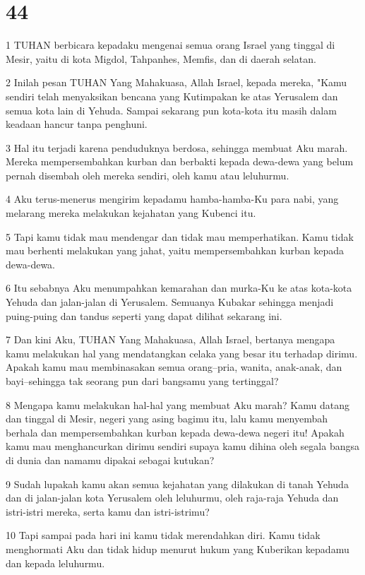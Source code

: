 \chapter{44}

\par 1 TUHAN berbicara kepadaku mengenai semua orang Israel yang tinggal di Mesir, yaitu di kota Migdol, Tahpanhes, Memfis, dan di daerah selatan.
\par 2 Inilah pesan TUHAN Yang Mahakuasa, Allah Israel, kepada mereka, "Kamu sendiri telah menyaksikan bencana yang Kutimpakan ke atas Yerusalem dan semua kota lain di Yehuda. Sampai sekarang pun kota-kota itu masih dalam keadaan hancur tanpa penghuni.
\par 3 Hal itu terjadi karena penduduknya berdosa, sehingga membuat Aku marah. Mereka mempersembahkan kurban dan berbakti kepada dewa-dewa yang belum pernah disembah oleh mereka sendiri, oleh kamu atau leluhurmu.
\par 4 Aku terus-menerus mengirim kepadamu hamba-hamba-Ku para nabi, yang melarang mereka melakukan kejahatan yang Kubenci itu.
\par 5 Tapi kamu tidak mau mendengar dan tidak mau memperhatikan. Kamu tidak mau berhenti melakukan yang jahat, yaitu mempersembahkan kurban kepada dewa-dewa.
\par 6 Itu sebabnya Aku menumpahkan kemarahan dan murka-Ku ke atas kota-kota Yehuda dan jalan-jalan di Yerusalem. Semuanya Kubakar sehingga menjadi puing-puing dan tandus seperti yang dapat dilihat sekarang ini.
\par 7 Dan kini Aku, TUHAN Yang Mahakuasa, Allah Israel, bertanya mengapa kamu melakukan hal yang mendatangkan celaka yang besar itu terhadap dirimu. Apakah kamu mau membinasakan semua orang--pria, wanita, anak-anak, dan bayi--sehingga tak seorang pun dari bangsamu yang tertinggal?
\par 8 Mengapa kamu melakukan hal-hal yang membuat Aku marah? Kamu datang dan tinggal di Mesir, negeri yang asing bagimu itu, lalu kamu menyembah berhala dan mempersembahkan kurban kepada dewa-dewa negeri itu! Apakah kamu mau menghancurkan dirimu sendiri supaya kamu dihina oleh segala bangsa di dunia dan namamu dipakai sebagai kutukan?
\par 9 Sudah lupakah kamu akan semua kejahatan yang dilakukan di tanah Yehuda dan di jalan-jalan kota Yerusalem oleh leluhurmu, oleh raja-raja Yehuda dan istri-istri mereka, serta kamu dan istri-istrimu?
\par 10 Tapi sampai pada hari ini kamu tidak merendahkan diri. Kamu tidak menghormati Aku dan tidak hidup menurut hukum yang Kuberikan kepadamu dan kepada leluhurmu.
